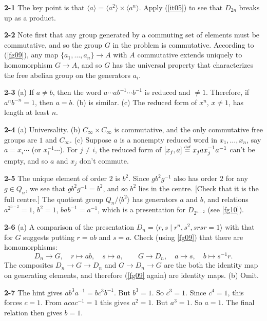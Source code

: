 \documentclass[a4paper,11pt,final]{memoir}%
\theoremstyle{nonumberplain}
\begin{document}
\bigskip\noindent\textbf{2-1}
The key point is that $\langle a\rangle=\langle a^{2}\rangle\times\langle
a^{n}\rangle$. Apply (\ref{it05}) to see that $D_{2n}$ breaks up as a product.

\bigskip\noindent\textbf{2-2}
Note first that any group generated by a commuting set of elements must be
commutative, and so the group $G$ in the problem is commutative. According to
(\ref{fg09}), any map $\{a_{1},\ldots,a_{n}\}\rightarrow A$ with $A$
commutative extends uniquely to homomorphism $G\rightarrow A$, and so $G$ has
the universal property that characterizes the free abelian group on the
generators $a_{i}$.

\bigskip\noindent\textbf{2-3}
(a) If $a\neq b$, then the word $a\cdots ab^{-1}\cdots b^{-1}$ is reduced and
$\neq1$. Therefore, if $a^{n}b^{-n}=1$, then $a=b$. (b) is similar. (c) The
reduced form of $x^{n}$, $x\neq1$, has length at least $n$.

\bigskip\noindent\textbf{2-4}
(a) Universality. (b) $C_{\infty}\times C_{\infty}$ is commutative, and the
only commutative free groups are $1$ and $C_{\infty}$. (c) Suppose $a$ is a
nonempty reduced word in $x_{1},\ldots,x_{n}$, say $a=x_{i}\cdots$ (or
$x_{i}^{-1}\cdots$). For $j\neq i$, the reduced form of $[x_{j},a]\overset
{\text{{\tiny def}}}{=}x_{j}ax_{j}^{-1}a^{-1}$ can't be empty, and so $a$ and
$x_{j}$ don't commute.

\bigskip\noindent\textbf{2-5}
The unique element of order $2$ is $b^{2}$. Since $gb^{2}g^{-1}$ also has
order $2$ for any $g\in Q_{n}$, we see that $gb^{2}g^{-1}=b^{2}$, and so
$b^{2}$ lies in the centre. [Check that it is the full centre.] The quotient
group $Q_{n}/\langle b^{2}\rangle$ has generators $a$ and $b$, and relations
$a^{2^{n-2}}=1$, $b^{2}=1$, $bab^{-1}=a^{-1}$, which is a presentation for
$D_{2^{n-2}}$ (see \ref{fg10}).

\bigskip\noindent\textbf{2-6}
(a) A comparison of the presentation $D_{n}=\langle r,s\mid r^{n}%
,s^{2},srsr=1\rangle$ with that for $G$ suggests putting $r=ab$ and $s=a$.
Check (using \ref{fg09}) that there are homomorphisms:
\[
D_{n}\rightarrow G,\quad r\mapsto ab,\quad s\mapsto a,\qquad G\rightarrow
D_{n},\quad a\mapsto s,\quad b\mapsto s^{-1}r\text{.}%
\]
The composites $D_{n}\rightarrow G\rightarrow D_{n}$ and $G\rightarrow
D_{n}\rightarrow G$ are the both the identity map on generating elements, and
therefore (\ref{fg09} again) are identity maps. (b) Omit.

\bigskip\noindent\textbf{2-7}
The hint gives $ab^{3}a^{-1}=bc^{3}b^{-1}$. But $b^{3}=1$. So $c^{3}=1$. Since
$c^{4}=1$, this forces $c=1$. From $acac^{-1}=1$ this gives $a^{2}=1$. But
$a^{3}=1$. So $a=1$. The final relation then gives $b=1 $.
\end{document}
